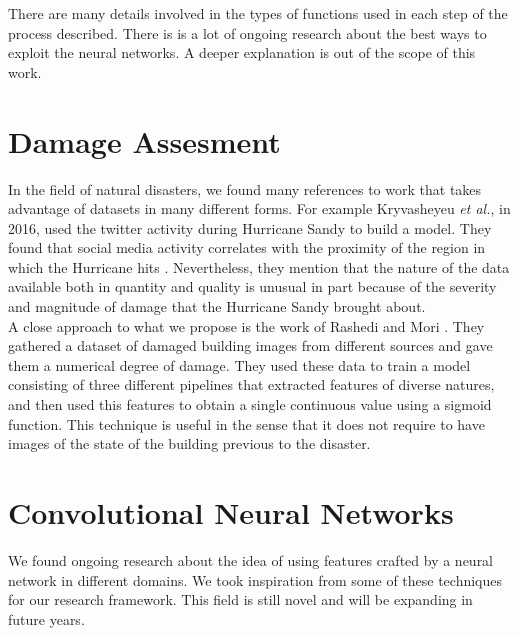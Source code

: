 There are many details involved in the types of functions used in each step of the process described. There is is a lot of ongoing research about the best ways to exploit the neural networks. A deeper explanation is out of the scope of this work.\\

\section{Damage Assesment}

In the field of natural disasters, we found many references to work that takes advantage of datasets in many different forms. For example Kryvasheyeu \textit{et al.}, in 2016, used the twitter activity during  Hurricane Sandy to build a model. They found that social media activity correlates with the proximity of the region in which the Hurricane hits \cite{Kryvasheyeue1500779}. Nevertheless, they mention that the nature of the data available both in quantity and quality is unusual in part because of the severity and magnitude of damage that the Hurricane Sandy brought about.\\

A close approach to what we propose is the work of Rashedi and Mori \cite{Nia2017BuildingDA}. They gathered a dataset of damaged building images from different sources and gave them a numerical degree of damage. They used these data to train a model consisting of three different pipelines that extracted features of diverse natures, and then used this features to obtain a single continuous value using a sigmoid function. This technique is useful in the sense that it does not require to have images of the state of the building previous to the disaster.\\


\section{Convolutional Neural Networks}

We found ongoing research about the idea of using features crafted by a neural network in different domains. We took inspiration from some of these techniques for our research framework. This field is still novel and will be expanding in future years.\\

